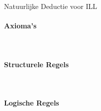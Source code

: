 \begin{figure}[ht]
\begin{theorem}\label{th:nd-ill} Natuurlijke Deductie voor ILL
\paragraph{Axioma's}\mbox{}\\[3mm]

\hspace{5mm}

\paragraph{Structurele Regels}\mbox{}\\[3mm]

\hspace{5mm}
\inference{C}{\Gamma, \lbrack A], \lbrack A \rbrack \vdash B}{\Gamma, \lbrack A\rbrack  \vdash B}
\hspace{5mm}

\paragraph{Logische Regels}\mbox{}\\[3mm]

\hspace{5mm}

\vspace{4mm}

\hspace{5mm}

\vspace{4mm}

\hspace{5mm}
\hspace{5mm}


\end{theorem}
\end{figure}
